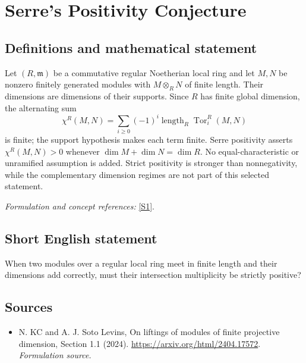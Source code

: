 \documentclass[11pt]{article}
\begin{document}
\section*{\texorpdfstring{Serre's Positivity Conjecture}{Serre's Positivity Conjecture}}\label{1469}
\subsection{Definitions and mathematical statement}
Let $(R,\mathfrak m)$ be a commutative regular Noetherian local ring and let $M,N$ be nonzero finitely generated modules with $M\otimes_RN$ of finite length. Their dimensions are dimensions of their supports. Since $R$ has finite global dimension, the alternating sum
\[
 \chi^R(M,N)=\sum_{i\ge0}(-1)^i
 \operatorname{length}_R\operatorname{Tor}_i^R(M,N)
\]
is finite; the support hypothesis makes each term finite. Serre positivity asserts $\chi^R(M,N)>0$ whenever $\dim M+\dim N=\dim R$. No equal-characteristic or unramified assumption is added. Strict positivity is stronger than nonnegativity, while the complementary dimension regimes are not part of this selected statement.
\par\smallskip\textit{Formulation and concept references:} \href{https://arxiv.org/html/2404.17572}{[S1]}.

\subsection{Short English statement}
When two modules over a regular local ring meet in finite length and their dimensions add correctly, must their intersection multiplicity be strictly positive?
\subsection{Sources}
\begin{itemize}
\item[S1]N. KC and A. J. Soto Levins, On liftings of modules of finite projective dimension, Section 1.1 (2024).
\url{https://arxiv.org/html/2404.17572}.
\textit{Formulation source.}
\end{itemize}
\end{document}
